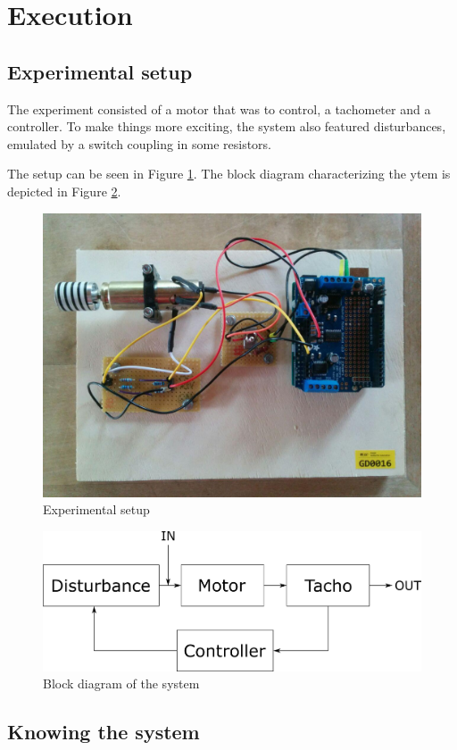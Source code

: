 \section{Execution}

\subsection{Experimental setup}

The experiment consisted of a motor that was to control, a tachometer and a controller. To make things more exciting, the system also featured disturbances, emulated by a switch coupling in some resistors.

The setup can be seen in Figure \ref{fig:setup}. The block diagram characterizing the ytem is depicted in Figure \ref{fig:blockdiagram}.

\begin{figure}[H]
\begin{center}
\includegraphics[width=0.6\linewidth]{images/general/setup}
\end{center}
\caption{Experimental setup}
\label{fig:setup}
\end{figure}

\begin{figure}[H]
\begin{center}
\includegraphics[width=0.6\linewidth]{images/general/motor_system}
\end{center}
\caption{Block diagram of the system}
\label{fig:blockdiagram}
\end{figure}

\subsection{Knowing the system}

